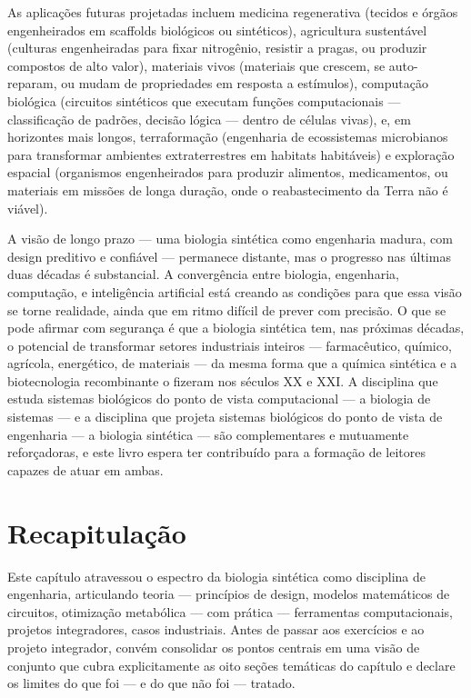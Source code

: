 As aplicações futuras projetadas incluem medicina regenerativa (tecidos e órgãos engenheirados em scaffolds biológicos ou sintéticos), agricultura sustentável (culturas engenheiradas para fixar nitrogênio, resistir a pragas, ou produzir compostos de alto valor), materiais vivos (materiais que crescem, se auto-reparam, ou mudam de propriedades em resposta a estímulos), computação biológica (circuitos sintéticos que executam funções computacionais --- classificação de padrões, decisão lógica --- dentro de células vivas), e, em horizontes mais longos, terraformação (engenharia de ecossistemas microbianos para transformar ambientes extraterrestres em habitats habitáveis) e exploração espacial (organismos engenheirados para produzir alimentos, medicamentos, ou materiais em missões de longa duração, onde o reabastecimento da Terra não é viável).

A visão de longo prazo --- uma biologia sintética como engenharia madura, com design preditivo e confiável --- permanece distante, mas o progresso nas últimas duas décadas é substancial. A convergência entre biologia, engenharia, computação, e inteligência artificial está creando as condições para que essa visão se torne realidade, ainda que em ritmo difícil de prever com precisão. O que se pode afirmar com segurança é que a biologia sintética tem, nas próximas décadas, o potencial de transformar setores industriais inteiros --- farmacêutico, químico, agrícola, energético, de materiais --- da mesma forma que a química sintética e a biotecnologia recombinante o fizeram nos séculos XX e XXI. A disciplina que estuda sistemas biológicos do ponto de vista computacional --- a biologia de sistemas --- e a disciplina que projeta sistemas biológicos do ponto de vista de engenharia --- a biologia sintética --- são complementares e mutuamente reforçadoras, e este livro espera ter contribuído para a formação de leitores capazes de atuar em ambas.

\section{Recapitulação}
\label{sec:14-recapitulacao}

Este capítulo atravessou o espectro da biologia sintética como disciplina de engenharia, articulando teoria --- princípios de design, modelos matemáticos de circuitos, otimização metabólica --- com prática --- ferramentas computacionais, projetos integradores, casos industriais. Antes de passar aos exercícios e ao projeto integrador, convém consolidar os pontos centrais em uma visão de conjunto que cubra explicitamente as oito seções temáticas do capítulo e declare os limites do que foi --- e do que não foi --- tratado.

